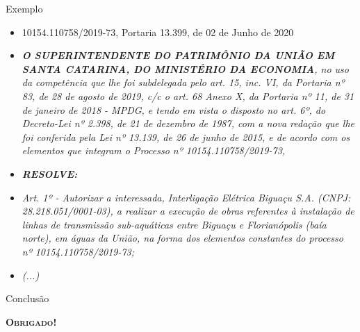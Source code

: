 \documentclass[9pt,ignorenonframetext,]{beamer}
\newif\ifbibliography
\providecommand{\tightlist}{%
  \setlength{\itemsep}{0pt}\setlength{\parskip}{0pt}}
\begin{document}
\begin{frame}{Exemplo}

\begin{itemize}[<+->]
\tightlist
\item
  \alert<1>{10154.110758/2019-73, Portaria 13.399, de 02 de Junho de 2020}
\item
  \alert<2>{\emph{\textbf{O SUPERINTENDENTE DO PATRIMÔNIO DA UNIÃO EM SANTA
  CATARINA, DO MINISTÉRIO DA ECONOMIA}, no uso da competência que lhe foi
  subdelegada pelo art. 15, inc. VI, da Portaria nº 83, de 28 de agosto de 2019,
  c/c o art. 68 Anexo X, da Portaria nº 11, de 31 de janeiro de 2018 - MPDG, e
  tendo em vista o disposto no art. 6º, do Decreto-Lei nº 2.398, de 21 de dezembro
  de 1987, com a nova redação que lhe foi conferida pela Lei nº 13.139, de 26 de
  junho de 2015, e de acordo com os elementos que integram o Processo nº
  10154.110758/2019-73,}}
\end{itemize}

\begin{itemize}[<+->]
\tightlist
\item
  \alert<3>{\emph{\textbf{RESOLVE:}}}
\end{itemize}

\begin{itemize}[<+->]
\tightlist
\item
  \alert<4>{\emph{Art. 1º - Autorizar a interessada, Interligação Elétrica
  Biguaçu S.A. (CNPJ: 28.218.051/0001-03), a realizar a execução de obras
  referentes à instalação de linhas de transmissão sub-aquáticas entre Biguaçu e
  Florianópolis (baía norte), em águas da União, na forma dos elementos constantes
  do processo nº 10154.110758/2019-73;}}
\end{itemize}

\begin{itemize}[<+->]
\tightlist
\item
  \alert<5>{\emph{(...)}}
\end{itemize}

\end{frame}

\begin{frame}{Conclusão}
\protect\hypertarget{conclusuxe3o}{}

\Huge\center \textbf{\textsc{Obrigado!}}

\end{frame}


  \begin{frame}[allowframebreaks]{}
  \bibliographytrue
  \printbibliography[heading=none]
  \end{frame}
\end{document}
